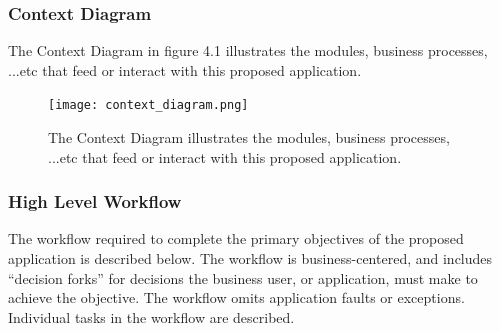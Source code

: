 \subsubsection{Context Diagram}
The Context Diagram in figure 4.1 illustrates the modules, business processes, ...etc that feed 
or interact with this proposed application.
\begin{figure}[H]
  \centering
  \texttt{[image: context\_diagram.png]}
  \caption[The Context Diagram illustrates the modules, business processes, ...etc that feed 
or interact with this proposed application.] {The Context Diagram illustrates the modules, business processes, ...etc that feed 
or interact with this proposed application.}
\end{figure}


\subsubsection{High Level Workflow}
The workflow required to complete the primary objectives of the proposed 
application is described below. The workflow is business-centered, and 
includes ``decision forks'' for decisions the business user, or application, 
must make to achieve the objective. The workflow omits application faults or exceptions. 
Individual tasks in the workflow are described.


